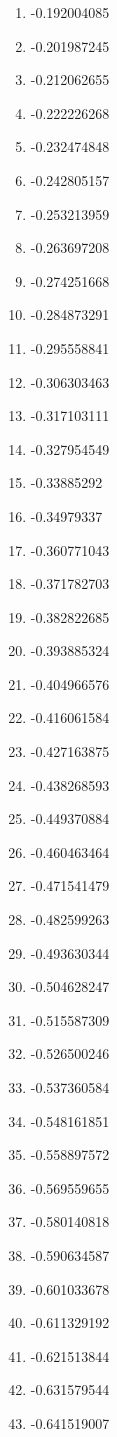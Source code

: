 \documentclass[6pt]{article}
\begin{document}
\begin{multicols}{4}
\begin{enumerate}
		\item -0.192004085
		\item -0.201987245
		\item -0.212062655
		\item -0.222226268
		\item -0.232474848
		\item -0.242805157
		\item -0.253213959
		\item -0.263697208
		\item -0.274251668
		\item -0.284873291
		\item -0.295558841
		\item -0.306303463
		\item -0.317103111
		\item -0.327954549
		\item -0.33885292
		\item -0.34979337
		\item -0.360771043
		\item -0.371782703
		\item -0.382822685
		\item -0.393885324
		\item -0.404966576
		\item -0.416061584
		\item -0.427163875
		\item -0.438268593
		\item -0.449370884
		\item -0.460463464
		\item -0.471541479
		\item -0.482599263
		\item -0.493630344
		\item -0.504628247
		\item -0.515587309
		\item -0.526500246
		\item -0.537360584
		\item -0.548161851
		\item -0.558897572
		\item -0.569559655
		\item -0.580140818
		\item -0.590634587
		\item -0.601033678
		\item -0.611329192
		\item -0.621513844
		\item -0.631579544
		\item -0.641519007

\end{enumerate}
\end{multicols}
\end{document}
